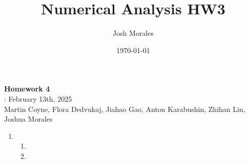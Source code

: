 \documentclass[12pt]{article}
\title{Numerical Analysis HW3}
\author{Josh Morales}
\date{\today}
\begin{document}
\pagestyle{fancy}
\begin{center}
\textbf{\Large Homework 4} \\
: February 13th, 2025\\
Martin Coyne, Flora Dedvukaj, Jiahao Gao, Anton Karabushin, Zhihan Lin, Joshua Morales
\end{center}
\begin{enumerate}[leftmargin=2em]
    \item
    \begin{enumerate}
        \item
        \item
    \end{enumerate}


\end{enumerate}
\end{document}
